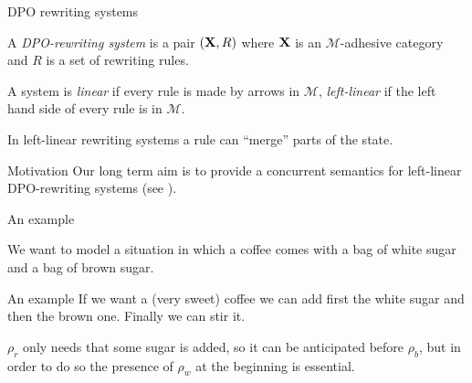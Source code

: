 \documentclass[usenames,dvipsnames]{beamer}
\def\X{\textbf {\textup{X}}}
\begin{document}
\begin{frame}{DPO rewriting systems}\justifying
		\begin{definition}
		A \emph{DPO-rewriting system} is a pair $(\X, R)$ where $\X$ is an $\mathcal{M}$-adhesive category and $R$ is a set of rewriting rules.
		\pause 
		
		A system is \emph{linear} if every rule is made by arrows in $\mathcal{M}$, \emph{left-linear} if the left hand side of every rule is in $\mathcal{M}$.
	\end{definition}

\pause 

In left-linear rewriting systems a rule can ``merge'' parts of the state.

\pause 
\begin{alertblock}{Motivation}
	Our long term aim is to provide a concurrent semantics for left-linear DPO-rewriting systems (see \cite{baldan2017domains}). 
\end{alertblock}

\end{frame}


\begin{frame}{An example}\justifying
	
	We want to model a situation in which a coffee comes
	with a bag of white sugar and a bag of brown sugar.
	
	\pause 
\begin{figure}
	

\end{figure}
\end{frame} 

\begin{frame}{An example}
	If we want a (very sweet) coffee we can add first the white sugar and then the brown one. Finally we can stir it.
	\pause 
\begin{figure}
	
\end{figure}\pause 

$\rho_r$ only needs that some sugar is added, so it can be anticipated before $\rho_b$, but in order to do so the presence of $\rho_w$ at the beginning is essential.
\end{frame}
\end{document}
